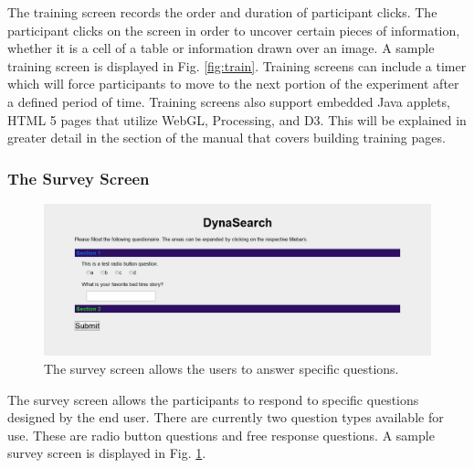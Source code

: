 \documentclass[article]{ij4uq}              %
\begin{document}
The training screen records the order and duration of participant clicks. The participant clicks on the screen in order to uncover certain pieces of information, whether it is a cell of a table or information drawn over an image. A sample training screen is displayed in Fig. \ref{fig:train}.  Training screens can include a timer which will force participants to move to the next portion of the experiment after a defined period of time.  Training screens also support embedded Java applets, HTML 5 pages that utilize WebGL, Processing, and D3.  This will be explained in greater detail in the section of the manual that covers building training pages.

\subsubsection{The Survey Screen}

\begin{figure}[h!]
 \centering
 \includegraphics[width=5.0in]{figures/survey_page.png}
 \caption{The survey screen allows the users to answer specific questions.}
 \label{fig:survey}
\end{figure}
\FloatBarrier

The survey screen allows the participants to respond to specific questions designed by the end user. There are currently two question types available for use.  These are radio button questions and free response questions. A sample survey screen is displayed in Fig. \ref{fig:survey}.



\end{document}
